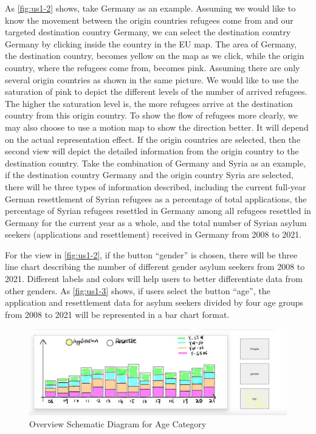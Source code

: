 \documentclass[journal]{vgtc}                %
\begin{document}
As \autoref{fig:us1-2} shows, take Germany as an example. Assuming we would like to know the movement between the origin countries refugees come from and our targeted destination country Germany, we can select the destination country Germany by clicking inside the country in the EU map. The area of Germany, the destination country, becomes yellow on the map as we click, while the origin country, where the refugees come from, becomes pink. Assuming there are only several origin countries as shown in the same picture. We would like to use the saturation of pink to depict the different levels of the number of arrived refugees. The higher the saturation level is, the more refugees arrive at the destination country from this origin country. To show the flow of refugees more clearly, we may also choose to use a motion map to show the direction better. It will depend on the actual representation effect. If the origin countries are selected, then the second view will depict the detailed information from the origin country to the destination country. Take the combination of Germany and Syria as an example, if the destination country Germany and the origin country Syria are selected, there will be three types of information described, including the current full-year German resettlement of Syrian refugees as a percentage of total applications, the percentage of Syrian refugees resettled in Germany among all refugees resettled in Germany for the current year as a whole, and the total number of Syrian asylum seekers (applications and resettlement) received in Germany from 2008 to 2021.

For the view in \autoref{fig:us1-2}, if the button “gender” is chosen, there will be three line chart describing the number of different gender asylum seekers from 2008 to 2021. Different labels and colors will help users to better differentiate data from other genders. As \autoref{fig:us1-3} shows, if users select the button “age”, the application and resettlement data for asylum seekers divided by four age groups from 2008 to 2021 will be represented in a bar chart format. 

\begin{figure}[tb]
  \centering %
  \includegraphics[width=\columnwidth]{fig4}
  \caption{Overview Schematic Diagram for Age Category}
  \label{fig:us1-3}
 \end{figure}
\end{document}
